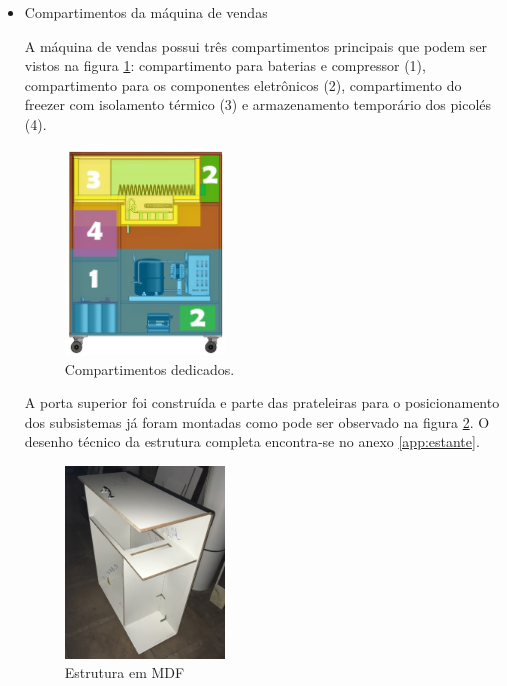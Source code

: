 \begin{itemize}
\item Compartimentos da máquina de vendas

A máquina de vendas possui três compartimentos principais que podem ser vistos na figura \ref{fig:cad_ZONAS}: compartimento para baterias e compressor (1), compartimento para os componentes eletrônicos (2), compartimento do freezer com isolamento térmico (3) e armazenamento temporário dos picolés (4).

   \begin{figure}[H]
	\centering
    \includegraphics[width=0.4\textwidth]{figuras/cad_ZONAS}
    \caption{Compartimentos dedicados.}
    \label{fig:cad_ZONAS}
\end{figure}

A porta superior foi construída e parte das prateleiras para o posicionamento dos subsistemas já foram montadas como pode ser observado na figura \ref{fig:armario_vista_isometrica}. O desenho técnico da estrutura completa encontra-se no anexo \ref{app:estante}.


   \begin{figure}[H]
	\centering
    \includegraphics[width=0.4\textwidth]{figuras/armario_vista_isometrica}
    \caption{Estrutura em MDF}
    \label{fig:armario_vista_isometrica}
\end{figure}


\end{itemize}
